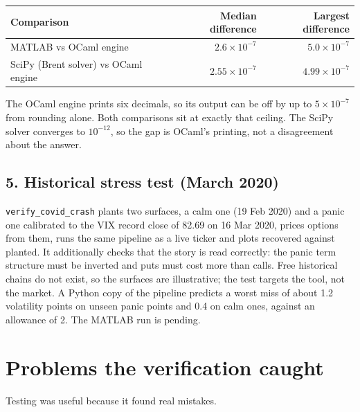 \documentclass[11pt]{article}
\begin{document}
\begin{center}
\begin{tabular}{@{}lrr@{}}
\toprule
\textbf{Comparison} & \textbf{Median difference} & \textbf{Largest difference}\\\midrule
MATLAB vs OCaml engine & $2.6\times10^{-7}$ & $5.0\times10^{-7}$\\
SciPy (Brent solver) vs OCaml engine & $2.55\times10^{-7}$ & $4.99\times10^{-7}$\\\bottomrule
\end{tabular}
\end{center}
The OCaml engine prints six decimals, so its output can be off by up to $5\times10^{-7}$ from rounding alone. Both comparisons sit at exactly that ceiling. The SciPy solver converges to $10^{-12}$, so the gap is OCaml's printing, not a disagreement about the answer.

\subsection*{5. Historical stress test (March 2020)}
\texttt{verify\_covid\_crash} plants two surfaces, a calm one (19 Feb 2020) and a panic one calibrated to the VIX record close of 82.69 on 16 Mar 2020, prices options from them, runs the same pipeline as a live ticker and plots recovered against planted. It additionally checks that the story is read correctly: the panic term structure must be inverted and puts must cost more than calls. Free historical chains do not exist, so the surfaces are illustrative; the test targets the tool, not the market. A Python copy of the pipeline predicts a worst miss of about 1.2 volatility points on unseen panic points and 0.4 on calm ones, against an allowance of 2. The MATLAB run is pending.

\section{Problems the verification caught}
Testing was useful because it found real mistakes.
\end{document}
